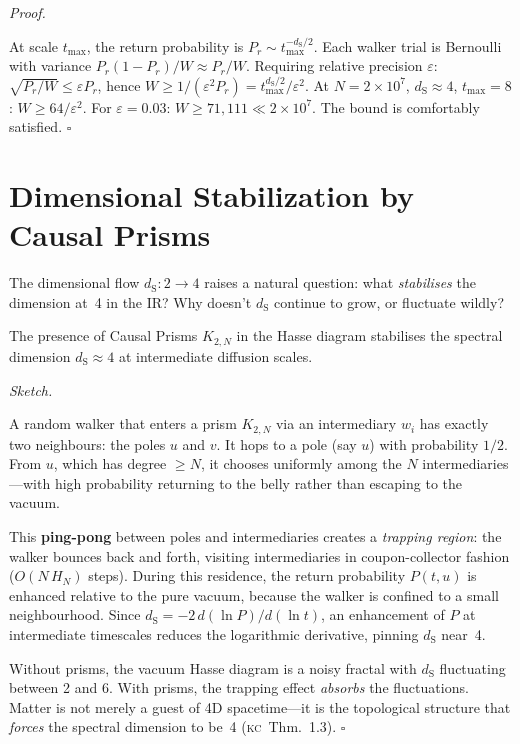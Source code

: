 \documentclass[11pt, a4paper, openany]{book}
\newcommand{\dS}{d_{\mathrm{S}}}
\newcommand{\KC}[1]{\textnormal{(\textsc{kc}~#1)}}
\newcounter{thm}[chapter]
\renewenvironment{proof}[1][Proof]{%
  \par\noindent\textit{#1.}\quad
}{\hfill$\square$\par\medskip}
\begin{document}
\begin{proof}
At scale $t_{\max}$, the return probability is $P_r \sim
t_{\max}^{-\dS/2}$. Each walker trial is Bernoulli with variance
$P_r(1-P_r)/W \approx P_r/W$. Requiring relative precision $\varepsilon$:
$\sqrt{P_r/W} \le \varepsilon P_r$, hence $W \ge 1/(\varepsilon^2 P_r) =
t_{\max}^{\dS/2}/\varepsilon^2$.
At $N = 2 \times 10^7$, $\dS \approx 4$, $t_{\max} = 8$:
$W \ge 64/\varepsilon^2$. For $\varepsilon = 0.03$: $W \ge 71{,}111 \ll
2 \times 10^7$. The bound is comfortably satisfied.
\end{proof}

\section{Dimensional Stabilization by Causal Prisms}\label{sec:dim-stab}

The dimensional flow $\dS: 2 \to 4$ raises a natural question: what
\emph{stabilises} the dimension at~4 in the IR? Why doesn't $\dS$
continue to grow, or fluctuate wildly?

\begin{theorem}[Ping-Pong Polar Trapping \KC{Thm.~1.3}]\label{thm:ping-pong}
The presence of Causal Prisms $K_{2,N}$ in the Hasse diagram stabilises
the spectral dimension $\dS \approx 4$ at intermediate diffusion scales.
\end{theorem}

\begin{proof}[Sketch]
A random walker that enters a prism $K_{2,N}$ via an intermediary $w_i$
has exactly two neighbours: the poles $u$ and $v$. It hops to a pole
(say $u$) with probability $1/2$. From $u$, which has degree $\ge N$,
it chooses uniformly among the $N$ intermediaries---with high probability
returning to the belly rather than escaping to the vacuum.

This \textbf{ping-pong} between poles and intermediaries creates a
\emph{trapping region}: the walker bounces back and forth, visiting
intermediaries in coupon-collector fashion ($O(N\,H_N)$ steps). During
this residence, the return probability $P(t,u)$ is enhanced relative
to the pure vacuum, because the walker is confined to a small
neighbourhood. Since $\dS = -2\,d(\ln P)/d(\ln t)$, an enhancement of
$P$ at intermediate timescales reduces the logarithmic derivative,
pinning $\dS$ near~4.

Without prisms, the vacuum Hasse diagram is a noisy fractal with
$\dS$ fluctuating between 2 and 6. With prisms, the trapping
effect \emph{absorbs} the fluctuations. Matter is not merely a guest
of 4D spacetime---it is the topological structure that \emph{forces}
the spectral dimension to be~4 \KC{Thm.~1.3}.
\end{proof}
\end{document}
